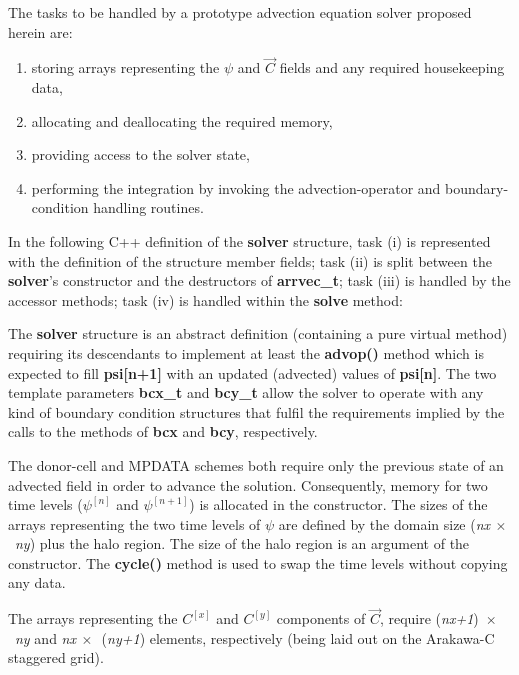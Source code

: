 \documentclass[twocolumn]{article}
\newcounter{lstnocpp}
\newcounter{linenocpp}
\newcommand*\FancyVerbStartString{}
\newcommand*\FancyVerbStopString{}
\newcommand{\codecpp}[4]{%
  \addtocounter{lstnocpp}{1}%
  \renewcommand*\FancyVerbStartString{\PY{c+c1}{//#2}}%
  \renewcommand*\FancyVerbStopString{\PY{c+c1}{//#3}}%
  \setcounter{FancyVerbLine}{\thelinenocpp}%
  \fvset{label={listing~C.\thelstnocpp~(C++)},rulecolor=\color{black},stepnumber=#4}%
  \setcounter{linenocpp}{\value{FancyVerbLine}}%
}
\newcommand{\prog}[1]{{\rm\bf#1}}
\begin{document}
  The tasks to be handled by a prototype advection equation solver proposed herein are:
  \begin{enumerate}[label=(\roman*), leftmargin=*, widest=iii]
    \item{storing arrays representing the $\psi$ and $\vec{C}$ fields and any required housekeeping data,}
    \item{allocating and deallocating the required memory,}
    \item{providing access to the solver state,}
    \item{performing the integration by invoking the advection-operator and
      boundary-condition handling routines.}
  \end{enumerate}
  In the following C++ definition of the \prog{solver} structure, task (i) is represented with the definition of the structure
    member fields; task (ii) is split between the \prog{solver}'s constructor and the destructors of \prog{arrvec\_t};
    task (iii) is handled by the accessor methods; task (iv) is handled within the \prog{solve} method:
  \codecpp{code-cpp-listings.hpp}{listing16}{listing17}{1}
  The \prog{solver} structure is an abstract definition (containing a pure virtual method) 
     requiring its descendants to implement at least
     the \prog{advop()} method which is expected to fill \prog{psi[n+1]} with an updated (advected)
     values of \prog{psi[n]}.
  The two template parameters \prog{bcx\_t} and \prog{bcy\_t} allow the solver to operate with 
    any kind of boundary condition structures that fulfil the requirements implied by the calls to the 
    methods of \prog{bcx} and \prog{bcy}, respectively.

  The donor-cell and MPDATA schemes both require only the previous state of an advected field
    in order to advance the solution.
  Consequently, memory for two time levels ($\psi^{[n]}$ and $\psi^{[n+1]}$) is allocated in the
    constructor.
  The sizes of the arrays representing the two time levels of $\psi$ 
    are defined by the domain size ({\em nx}$~\times$~{\em ny}) plus the halo region.
  The size of the halo region is an argument of the constructor.
  The \prog{cycle()} method is used to swap the time levels without copying any data.

  The arrays representing the $C^{[x]}$ and $C^{[y]}$ components of $\vec{C}$,
    require ({\em nx+1})~$\times$~{\em ny} 
    and {\em nx}$~\times$~({\em ny+1}) elements, respectively
    (being laid out on the Arakawa-C staggered grid).
  
\end{document}

